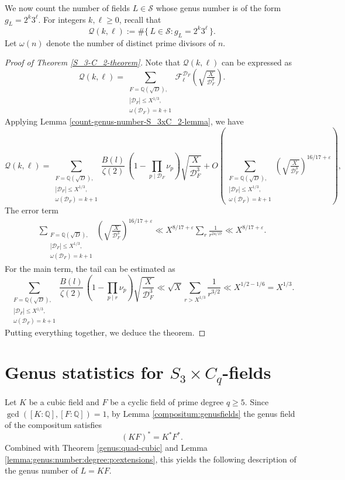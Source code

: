 \documentclass[11pt,reqno]{amsart}
\newcommand{\Q}{\mathbb{Q}}
\newcommand{\cD}{\mathcal{D}}
\newcommand{\cF}{\mathcal{F}}
\newcommand{\cQ}{\mathcal{Q}}
\theoremstyle{definition}
\theoremstyle{remark}
\begin{document}
\noindent
We now count the number of fields $L \in \mathcal{S}$ whose genus number is of the form  $g_L = 2^{k} 3^{\ell}$. For integers $k,\ell\geq 0$, recall that
\[
\cQ(k,\ell):=\#\{\, L \in \mathcal{S} : g_L =2^{k} 3^{\ell} \,\}.
\]
Let $\omega(n)$ denote the number of distinct prime divisors of $n$.
\begin{proof}[Proof of Theorem \ref{S_3-C_2-theorem}]
Note that $\cQ(k,\ell)$ can be expressed as
\[
\cQ(k,\ell)
= \sum_{\substack{ F= \Q(\sqrt{D}), \\  |\cD_F|\leq X^{1/3}, \\\omega(\cD_F) = k+1}}
\cF_{\ell}^{\cD_F}\!\left(\sqrt{\tfrac{X}{\cD_F^3}}\right).
\]
Applying Lemma \ref{count-genus-number-S_3xC_2-lemma}, we have
$$
\cQ(k,\ell) = \sum_{\substack{ F= \Q(\sqrt{D}), \\  |\cD_F|\leq X^{1/3}, \\\omega(\cD_F) = k+1}}\frac{B(l)}{\zeta(2)} \, \left(1 -  \prod_{p \mid \cD_F} \nu_p\right) \sqrt{\frac{X}{\cD_F^3}} + O\left(\sum_{\substack{ F= \Q(\sqrt{D}), \\  |\cD_F|\leq X^{1/3}, \\\omega(\cD_F) = k+1}}
	\left(\sqrt{\tfrac{X}{\cD_F^3}}\right)^{16/17+\varepsilon}\right),
$$
The error term 
\begin{align*}
 \sum_{\substack{ F= \Q(\sqrt{D}), \\  |\cD_F|\leq X^{1/3}, \\\omega(\cD_F) = k+1}} 
	\left(\sqrt{\tfrac{X}{\cD_F^3}}\right)^{16/17+\varepsilon} \ll X^{8/17+\varepsilon} \sum_{r} \frac{1}{r^{24/17}} \ll X^{8/17+\varepsilon}.
\end{align*}
For the main term, the tail can be estimated as
$$
 \sum_{\substack{ F= \Q(\sqrt{D}), \\  |\cD_F|\leq X^{1/3}, \\\omega(\cD_F) = k+1}} 
 \frac{B(l)}{\zeta(2)} \, \left(1 -  \prod_{p \mid r} \nu_p\right) \sqrt{\frac{X}{\cD_F^3}} \ll  \sqrt{X}\sum_{r>X^{1/3}}\frac{1}{r^{3/2}} \ll X^{1/2 - 1/6} = X^{1/3}. 
$$
Putting everything together, we deduce the theorem.
\end{proof}


\medskip

\section{\bf Genus statistics for $S_3\times C_q$-fields}\label{S_3xC_q}
\medskip
Let $K$ be a cubic field and $F$ be a cyclic field of prime degree $q\ge 5$.  
Since $\gcd([K:\mathbb{Q}], [F:\mathbb{Q}]) = 1$, by Lemma
\ref{compositum:genusfields} the genus field of the compositum satisfies
\[
    (KF)^{*} = K^{*} F^{*}.
\]
Combined with Theorem \ref{genus:quad-cubic} and Lemma \ref{lemma:genus:number:degree:p:extensions}, this yields the following description of the genus number of $L = KF$.
\end{document}
